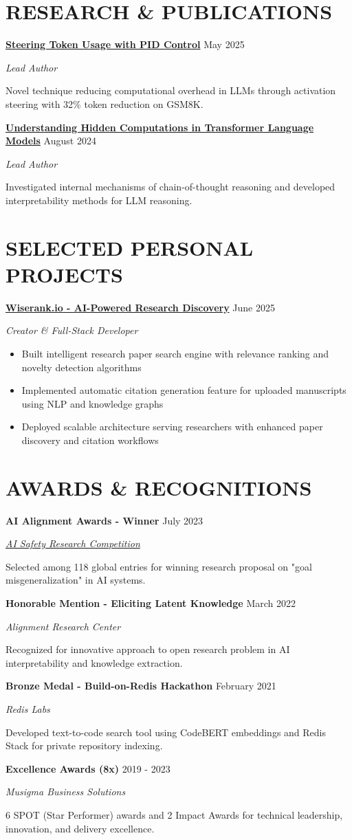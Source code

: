 \documentclass[fontsize=11pt]{article}
\newcommand{\NewPart}[1]{\section*{\uppercase{#1}}}
\newcommand{\ProjectEntry}[4]{
    \noindent \textbf{#1} \hfill {#2} \par
    \noindent \textit{#3} \par
    \noindent \small #4
    \normalsize \par}
\newcommand{\AwardEntry}[4]{
    \noindent \textbf{#1} \hfill {#2} \par
    \noindent \textit{#3} \par
    \noindent \small #4
    \normalsize \par}
\begin{document}
\NewPart{RESEARCH \& PUBLICATIONS}

\ProjectEntry{\href{https://arxiv.org/abs/2506.18831}{Steering Token Usage with PID Control}}{May 2025}{Lead Author}
{Novel technique reducing computational overhead in LLMs through activation steering with 32\% token reduction on GSM8K.}

\ProjectEntry{\href{https://arxiv.org/html/2412.04537}{Understanding Hidden Computations in Transformer Language Models}}{August 2024}{Lead Author}
{Investigated internal mechanisms of chain-of-thought reasoning and developed interpretability methods for LLM reasoning.}

\NewPart{SELECTED PERSONAL PROJECTS}
\ProjectEntry{\href{https://wiserank.io}{Wiserank.io - AI-Powered Research Discovery}}{June 2025}{Creator \& Full-Stack Developer}
{%
\begin{itemize}
\item Built intelligent research paper search engine with relevance ranking and novelty detection algorithms
\item Implemented automatic citation generation feature for uploaded manuscripts using NLP and knowledge graphs
\item Deployed scalable architecture serving researchers with enhanced paper discovery and citation workflows
\end{itemize}}

\NewPart{AWARDS \& RECOGNITIONS}

\AwardEntry{AI Alignment Awards - Winner}{July 2023}{\href{https://www.lesswrong.com/posts/zFoAAD7dfWdczxoLH/winners-of-ai-alignment-awards-research-contest}{AI Safety Research Competition}}
{Selected among 118 global entries for winning research proposal on "goal misgeneralization" in AI systems.}

\AwardEntry{Honorable Mention - Eliciting Latent Knowledge}{March 2022}{Alignment Research Center}
{Recognized for innovative approach to open research problem in AI interpretability and knowledge extraction.}

\AwardEntry{Bronze Medal - Build-on-Redis Hackathon}{February 2021}{Redis Labs}
{Developed text-to-code search tool using CodeBERT embeddings and Redis Stack for private repository indexing.}

\AwardEntry{Excellence Awards (8x)}{2019 - 2023}{Musigma Business Solutions}
{6 SPOT (Star Performer) awards and 2 Impact Awards for technical leadership, innovation, and delivery excellence.}
\end{document}
